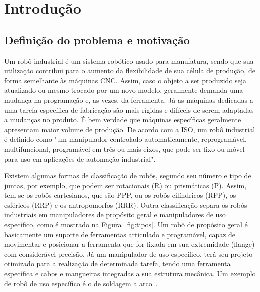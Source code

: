 \chapter{Introdução}    %
    \label{chp:introducao}
    \section{Definição do problema e motivação}
        Um robô industrial é um sistema robótico usado para manufatura, sendo que sua utilização contribui para o aumento da flexibilidade de sua célula de produção, de forma semelhante às máquinas \ac{CNC}. Assim, caso o objeto a ser produzido seja atualizado ou mesmo trocado por um novo modelo, geralmente demanda uma mudança na programação e, as vezes, da ferramenta. Já as máquinas dedicadas a uma tarefa específica de fabricação são mais rígidas e difíceis de serem adaptadas a mudanças no produto. É bem verdade que máquinas específicas geralmente apresentam maior volume de produção. De acordo com a \ac{ISO}, um robô industrial é definido como "um manipulador controlado automaticamente, reprogramável, multifuncional, programável em três ou mais eixos, que pode ser fixo ou móvel para uso em aplicações de automação industrial".
        
        Existem algumas formas de classificação de robôs, segundo seu número e tipo de juntas, por exemplo, que podem ser rotacionais (R) ou prismáticas (P). Assim, tem-se os robôs cartesianos, que são PPP, ou os robôs cilíndricos (RPP), os esféricos (RRP) e os antropomorfos (RRR). Outra classificação separa os robôs industriais em manipuladores de propósito geral e manipuladores de uso específico, como é mostrado na Figura~\ref{fig:tipos}. Um robô de propósito geral é basicamente um suporte de ferramentas articulado e programável, capaz de movimentar e posicionar a ferramenta que for fixada em sua extremidade (flange) com considerável precisão. Já um manipulador de uso específico, terá seu projeto otimizado para a realização de determinada tarefa, tendo uma ferramenta específica e cabos e mangueiras integradas a sua estrutura mecânica. Um exemplo de robô de uso específico é o de soldagem a arco~\cite{spong2005robot}.
        
